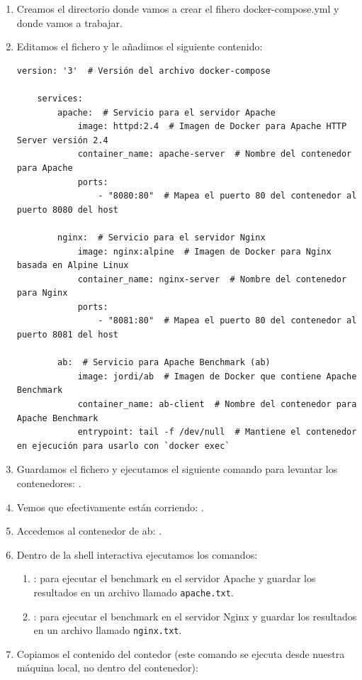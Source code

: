 \begin{enumerate}
    \item Creamos el directorio donde vamos a crear el fihero docker-compose.yml y donde vamos a trabajar.
    \item Editamos el fichero  y le añadimos el siguiente contenido:
    \begin{lstlisting}[style=customstyle]
    version: '3'  # Versión del archivo docker-compose

    services:
        apache:  # Servicio para el servidor Apache
            image: httpd:2.4  # Imagen de Docker para Apache HTTP Server versión 2.4
            container_name: apache-server  # Nombre del contenedor para Apache
            ports:
                - "8080:80"  # Mapea el puerto 80 del contenedor al puerto 8080 del host

        nginx:  # Servicio para el servidor Nginx
            image: nginx:alpine  # Imagen de Docker para Nginx basada en Alpine Linux
            container_name: nginx-server  # Nombre del contenedor para Nginx
            ports:
                - "8081:80"  # Mapea el puerto 80 del contenedor al puerto 8081 del host

        ab:  # Servicio para Apache Benchmark (ab)
            image: jordi/ab  # Imagen de Docker que contiene Apache Benchmark
            container_name: ab-client  # Nombre del contenedor para Apache Benchmark
            entrypoint: tail -f /dev/null  # Mantiene el contenedor en ejecución para usarlo con `docker exec`
        \end{lstlisting}
        \item Guardamos el fichero y ejecutamos el siguiente comando para levantar los contenedores: .
        \item Vemos que efectivamente están corriendo: .
        \item Accedemos al contenedor de ab: .
        \item Dentro de la shell interactiva ejecutamos los comandos:
        \begin{enumerate}
            \item {}: para ejecutar el benchmark en el servidor Apache y guardar los resultados en un archivo llamado \texttt{apache.txt}.
            \item {}: para ejecutar el benchmark en el servidor Nginx y guardar los resultados en un archivo llamado \texttt{nginx.txt}.
        \end{enumerate}
        \item Copiamos el contenido del contedor (este comando se ejecuta desde nuestra máquina local, no dentro del contenedor): 
\end{enumerate}


